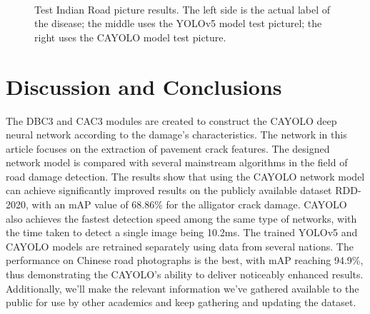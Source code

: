 \documentclass[sensors,article,submit,moreauthors]{Definitions/mdpi}
\begin{document}
\begin{figure}[H]
{\begin{minipage}{0.9\textwidth}
            \end{minipage}}\\

        \captionsetup[subfloat]{labelformat=parens}
        \caption{Test Indian Road picture results. The left side is the actual label of the disease; the middle uses the YOLOv5 model test picturel; the right uses the CAYOLO model test picture.\label{fig:14}}
    \end{figure}


    \section{Discussion and Conclusions}


    The DBC3 and CAC3 modules are created to construct the CAYOLO deep neural network according to the damage's characteristics. The network in this article focuses on the extraction of pavement crack features. The designed network model is compared with several mainstream algorithms in the field of road damage detection. The results show that using the CAYOLO network model can achieve significantly improved results on the publicly available dataset RDD-2020, with an mAP value of 68.86\% for the alligator crack damage. CAYOLO also achieves the fastest detection speed among the same type of networks, with the time taken to detect a single image being 10.2ms. The trained YOLOv5 and CAYOLO models are retrained separately using data from several nations. The performance on Chinese road photographs is the best, with mAP reaching 94.9\%, thus demonstrating the CAYOLO's ability to deliver noticeably enhanced results. Additionally, we'll make the relevant information we've gathered available to the public for use by other academics and keep gathering and updating the dataset.
\end{document}
